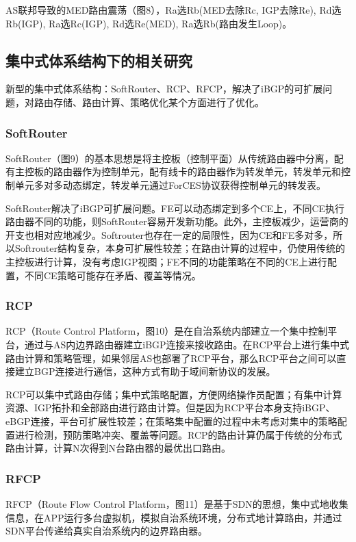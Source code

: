 \begin{itemize}
AS联邦导致的MED路由震荡（图8），Ra选Rb(MED去除Rc, IGP去除Re), Rd选Rb(IGP), Ra选Rc(IGP), Rd选Re(MED), Ra选Rb(路由发生Loop)。

\subsection{集中式体系结构下的相关研究}
新型的集中式体系结构：SoftRouter、RCP、RFCP，解决了iBGP的可扩展问题，对路由存储、路由计算、策略优化某个方面进行了优化。
\subsubsection{SoftRouter}
SoftRouter（图9）的基本思想是将主控板（控制平面）从传统路由器中分离，配有主控板的路由器作为控制单元，配有线卡的路由器作为转发单元，转发单元和控制单元多对多动态绑定，转发单元通过ForCES协议获得控制单元的转发表。

SoftRouter解决了iBGP可扩展问题。FE可以动态绑定到多个CE上，不同CE执行路由器不同的功能，则SoftRouter容易开发新功能。此外，主控板减少，运营商的开支也相对应地减少。Softrouter也存在一定的局限性，因为CE和FE多对多，所以Softrouter结构复杂，本身可扩展性较差；在路由计算的过程中，仍使用传统的主控板进行计算，没有考虑IGP视图；FE不同的功能策略在不同的CE上进行配置，不同CE策略可能存在矛盾、覆盖等情况。

\subsubsection{RCP}
RCP（Route Control Platform，图10）是在自治系统内部建立一个集中控制平台，通过与AS内边界路由器建立iBGP连接来接收路由。在RCP平台上进行集中式路由计算和策略管理，如果邻居AS也部署了RCP平台，那么RCP平台之间可以直接建立BGP连接进行通信，这种方式有助于域间新协议的发展。

RCP可以集中式路由存储；集中式策略配置，方便网络操作员配置；有集中计算资源、IGP拓扑和全部路由进行路由计算。但是因为RCP平台本身支持iBGP、eBGP连接，平台可扩展性较差；在策略集中配置的过程中未考虑对集中的策略配置进行检测，预防策略冲突、覆盖等问题。RCP的路由计算仍属于传统的分布式路由计算，计算N次得到N台路由器的最优出口路由。

\subsubsection{RFCP}
RFCP（Route Flow Control Platform，图11）是基于SDN的思想，集中式地收集信息，在APP运行多台虚拟机，模拟自治系统环境，分布式地计算路由，并通过SDN平台传递给真实自治系统内的边界路由器。


\end{itemize}
